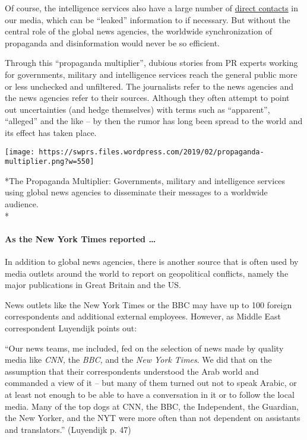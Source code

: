 Of course, the intelligence services also have a large number of
\href{http://www.carlbernstein.com/magazine_cia_and_media.php}{direct
contacts} in our media, which can be ``leaked'' information to if
necessary. But without the central role of the global news agencies, the
worldwide synchronization of propaganda and disinformation would never
be so efficient.

Through this ``propaganda multiplier'', dubious stories from PR experts
working for governments, military and intelligence services reach the
general public more or less unchecked and unfiltered. The journalists
refer to the news agencies and the news agencies refer to their sources.
Although they often attempt to point out uncertainties (and hedge
themselves) with terms such as ``apparent'', ``alleged'' and the like --
by then the rumor has long been spread to the world and its effect has
taken place.

\texttt{[image: https://swprs.files.wordpress.com/2019/02/propaganda-multiplier.png?w=550]}

*The Propaganda Multiplier: Governments, military and intelligence
services using global news agencies to disseminate their messages to a
worldwide audience.\\
*

\hypertarget{as-the-new-york-times-reported-}{%
\paragraph{As the New York Times reported
\ldots{}}\label{as-the-new-york-times-reported-}}

In addition to global news agencies, there is another source that is
often used by media outlets around the world to report on geopolitical
conflicts, namely the major publications in Great Britain and the US.

News outlets like the New York Times or the BBC may have up to 100
foreign correspondents and additional external employees. However, as
Middle East correspondent Luyendijk points out:

``Our news teams, me included, fed on the selection of news made by
quality media like \emph{CNN,} the \emph{BBC,} and the \emph{New York
Times}. We did that on the assumption that their correspondents
understood the Arab world and commanded a view of it -- but many of them
turned out not to speak Arabic, or at least not enough to be able to
have a conversation in it or to follow the local media. Many of the top
dogs at CNN, the BBC, the Independent, the Guardian, the New Yorker, and
the NYT were more often than not dependent on assistants and
translators.'' (Luyendijk p. 47)

